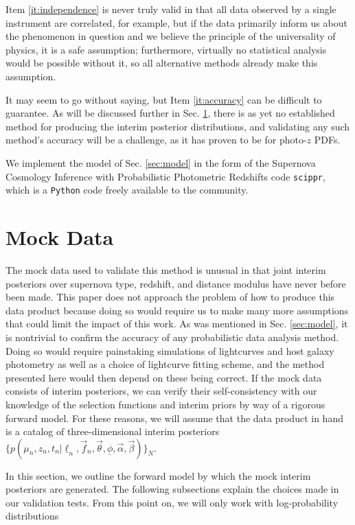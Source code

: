 \documentclass[12pt, onecolumn]{emulateapj}
\newcommand{\textul}{\underline}
\newcommand{\scippr}{\texttt{scippr}}
\begin{document}
Item \ref{it:independence} is never truly valid in that all data observed by a single instrument are correlated, for example, but if the data primarily inform us about the phenomenon in question and we believe the principle of the universality of physics, it is a safe assumption; furthermore, virtually no statistical analysis would be possible without it, so all alternative methods already make this assumption.

It may seem to go without saying, but Item \ref{it:accuracy} can be difficult to guarantee.  As will be discussed further in Sec. \ref{sec:data}, there is as yet no established method for producing the interim posterior distributions, and validating any such method's accuracy will be a challenge, as it has proven to be for photo-$z$ PDFs.

We implement the model of Sec. \ref{sec:model} in the form of the Supernova Cosmology Inference with Probabilistic Photometric Redshifts code \scippr, which is a \texttt{Python} code freely available to the community.

\section{Mock Data}
\label{sec:data}

The mock data used to validate this method is unusual in that joint interim posteriors over supernova type, redshift, and distance modulus have never before been made.  This paper does not approach the problem of how to produce this data product because doing so would require us to make many more assumptions that could limit the impact of this work.  As was mentioned in Sec. \ref{sec:model}, it is nontrivial to confirm the accuracy of any probabilistic data analysis method.  Doing so would require painstaking simulations of lightcurves and host galaxy photometry as well as a choice of lightcurve fitting scheme, and the method presented here would then depend on these being correct.  If the mock data consists of interim posteriors, we can verify their self-consistency with our knowledge of the selection functions and interim priors by way of a rigorous forward model.  For these reasons, we will assume that the data product in hand is a catalog of three-dimensional interim posteriors $\{p(\mu_{n}, z_{n}, t_{n} | \textul{\ell}_{n}, \vec{f}_{n}, \vec{\theta}, \textul{\phi}, \vec{\alpha}, \vec{\beta})\}_{N}$.

In this section, we outline the forward model by which the mock interim posteriors are generated.  The following subsections explain the choices made in our validation tests.  From this point on, we will only work with log-probability distributions
\end{document}
